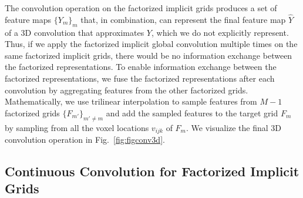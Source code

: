 The convolution operation on the factorized implicit grids produces a set of feature maps $\{Y_m\}_m$ that, in combination, can represent the final feature map $\hat{Y}$ of a 3D convolution that approximates $Y$, which we do not explicitly represent.
Thus, if we apply the factorized implicit global convolution multiple times on the same factorized implicit grids, there would be no information exchange between the factorized representations.
To enable information exchange between the factorized representations, we fuse the factorized representations after each convolution by aggregating features from the other factorized grids.
Mathematically, we use trilinear interpolation to sample features from $M-1$ factorized grids $\{F_{m'}\}_{m'\neq m}$ and add the sampled features to the target grid $F_m$ by sampling from all the voxel locations $v_{ijk}$ of $F_m$. We visualize the final 3D convolution operation in Fig.~\ref{fig:figconv3d}.


\subsection{Continuous Convolution for Factorized Implicit Grids}


